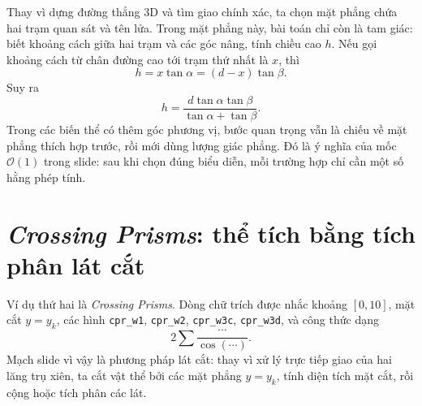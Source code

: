 \documentclass[11pt]{article}
\newcommand{\Oh}{\mathcal{O}}
\begin{document}
\begin{center}
\end{center}

Thay vì dựng đường thẳng 3D và tìm giao chính xác, ta chọn mặt phẳng chứa hai
trạm quan sát và tên lửa. Trong mặt phẳng này, bài toán chỉ còn là tam giác:
biết khoảng cách giữa hai trạm và các góc nâng, tính chiều cao \(h\). Nếu gọi
khoảng cách từ chân đường cao tới trạm thứ nhất là \(x\), thì
\[
  h=x\tan\alpha=(d-x)\tan\beta.
\]
Suy ra
\[
  h=\frac{d\tan\alpha\tan\beta}{\tan\alpha+\tan\beta}.
\]
Trong các biến thể có thêm góc phương vị, bước quan trọng vẫn là chiếu về mặt
phẳng thích hợp trước, rồi mới dùng lượng giác phẳng. Đó là ý nghĩa của mốc
\(\Oh(1)\) trong slide: sau khi chọn đúng biểu diễn, mỗi trường hợp chỉ cần
một số hằng phép tính.

\section{\textit{Crossing Prisms}: thể tích bằng tích phân lát cắt}

Ví dụ thứ hai là \textit{Crossing Prisms}. Dòng chữ trích được nhắc khoảng
\([0,10]\), mặt cắt \(y=y_k\), các hình \texttt{cpr\_w1}, \texttt{cpr\_w2},
\texttt{cpr\_w3c}, \texttt{cpr\_w3d}, và công thức dạng
\[
  2\sum \frac{\cdots}{\cos(\cdots)}.
\]
Mạch slide vì vậy là phương pháp lát cắt: thay vì xử lý trực tiếp giao của
hai lăng trụ xiên, ta cắt vật thể bởi các mặt phẳng \(y=y_k\), tính diện tích
mặt cắt, rồi cộng hoặc tích phân các lát.

\begin{center}
\end{center}
\end{document}
